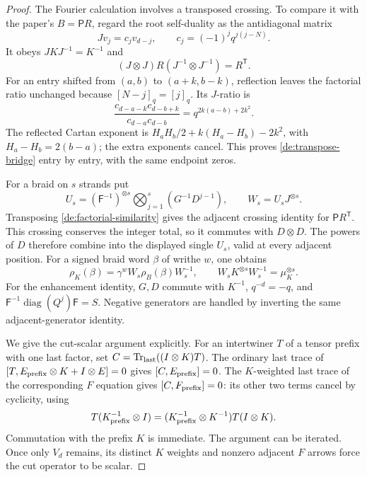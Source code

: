 \begin{proof}
The Fourier calculation involves a transposed crossing. To
compare it with the paper's \(B=\mathsf P R\), regard the
root self-duality as the antidiagonal matrix
\[
 Jv_j=c_jv_{d-j},\qquad
 c_j=(-1)^jq^{j(j-N)}.
\]
It obeys \(JKJ^{-1}=K^{-1}\) and
\begin{equation}\label{de:transpose-bridge}
 (J\otimes J)R(J^{-1}\otimes J^{-1})=R^{\mathsf T}.
\end{equation}
For an entry shifted from \((a,b)\) to \((a+k,b-k)\),
reflection leaves the factorial ratio unchanged because
\([N-j]_q=[j]_q\). Its \(J\)-ratio is
\[
 \frac{c_{d-a-k}c_{d-b+k}}{c_{d-a}c_{d-b}}
                 =q^{2k(a-b)+2k^2}.
\]
The reflected Cartan exponent is
\(H_aH_b/2+k(H_a-H_b)-2k^2\), with
\(H_a-H_b=2(b-a)\); the extra exponents cancel. This proves
\eqref{de:transpose-bridge} entry by entry, with the same
endpoint zeros.

For a braid on \(s\) strands put
\[
 U_s=(\mathsf F^{-1})^{\otimes s}
             \bigotimes_{j=1}^s(G^{-1}D^{j-1}),
 \qquad W_s=U_sJ^{\otimes s}.
\]
Transposing \eqref{de:factorial-similarity} gives the adjacent
crossing identity for \(\mathsf P R^{\mathsf T}\).
This crossing conserves the integer total, so it commutes with
\(D\otimes D\). The powers of \(D\) therefore combine into
the displayed single \(U_s\), valid at every adjacent position.
For a signed braid word \(\beta\) of writhe \(w\), one obtains
\begin{equation}\label{de:simultaneous-braid-gauge}
 \rho_K(\beta)=\gamma^w W_s\rho_B(\beta)W_s^{-1},
 \qquad
 W_sK^{\otimes s}W_s^{-1}=\mu_K^{\otimes s}.
\end{equation}
For the enhancement identity, \(G,D\) commute with \(K^{-1}\),
\(q^{-d}=-q\), and
\(\mathsf F^{-1}\operatorname{diag}(Q^j)\mathsf F=S\).
Negative generators are handled by inverting the same
adjacent-generator identity.

We give the cut-scalar argument explicitly. For an intertwiner
\(T\) of a tensor prefix with one last factor, set
\(C=\operatorname{Tr}_{\rm last}((I\otimes K)T)\).
The ordinary last trace of
\([T,E_{\rm prefix}\otimes K+I\otimes E]=0\)
gives \([C,E_{\rm prefix}]=0\). The \(K\)-weighted last trace
of the corresponding \(F\) equation gives
\([C,F_{\rm prefix}]=0\): its other two terms cancel by
cyclicity, using
\[
 T(K_{\rm prefix}^{-1}\otimes I)
 =(K_{\rm prefix}^{-1}\otimes K^{-1})T(I\otimes K).
\]
Commutation with the prefix \(K\) is immediate. The argument
can be iterated. Once only \(V_d\) remains, its distinct \(K\)
weights and nonzero adjacent \(F\) arrows force the cut
operator to be scalar.


\end{proof}
